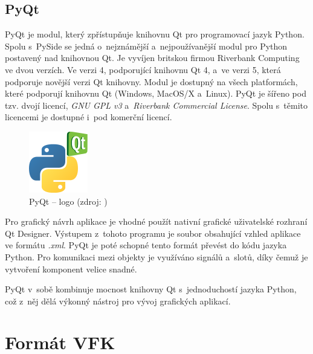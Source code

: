 \documentclass[12pt]{article}
\begin{document}
\subsection{PyQt}

PyQt je modul, který zpřístupňuje knihovnu Qt pro programovací jazyk Python. Spolu s~PySide se jedná o~nejznámější a~nejpoužívanější modul pro Python postavený nad knihovnou Qt. Je vyvíjen britskou firmou Riverbank Computing ve dvou verzích. Ve verzi 4, podporující knihovnu Qt 4, a~ve verzi 5, která podporuje novější verzi Qt knihovny. Modul je dostupný na všech platformách, které podporují knihovnu Qt (Windows, MacOS/X a~Linux). PyQt je šířeno pod tzv. dvojí licencí, \textit{GNU GPL v3} a~\textit{Riverbank Commercial License}. Spolu s~těmito licencemi je dostupné i~pod komerční licencí.

\begin{figure}[htb]
\centering
\includegraphics[scale=1]{images/pyqt-logo.png}
\caption[PyQt -- logo]{PyQt -- logo (zdroj: \cite{pyqt_wiki})}
\end{figure}

Pro grafický návrh aplikace je vhodné použít nativní grafické uživatelské rozhraní Qt Designer. Výstupem z~tohoto programu je soubor obsahující vzhled aplikace ve formátu \textit{.xml}. PyQt je poté schopné tento formát převést do kódu jazyka Python. Pro komunikaci mezi objekty je využíváno signálů a~slotů, díky čemuž je vytvoření komponent velice snadné.

PyQt v~sobě kombinuje mocnost knihovny Qt s~jednoduchostí jazyka Python, což z~něj dělá výkonný nástroj pro vývoj grafických aplikací.
\cite{pyqt}
\cite{pyqt_wiki}



\clearpage
\section{Formát VFK}

\cite{dp_landa}
\cite{vfk_struktura}
\end{document}
